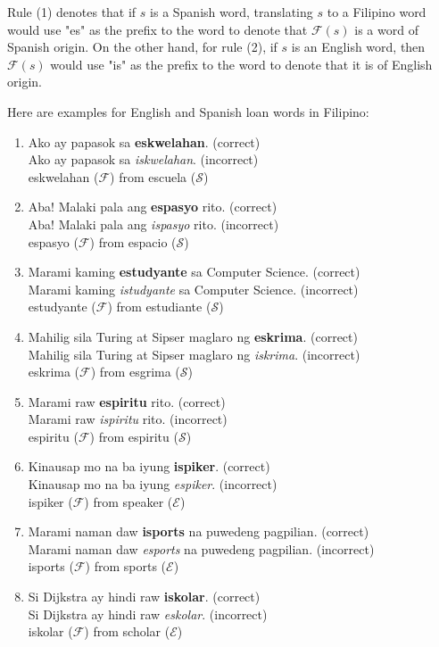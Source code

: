 Rule (1) denotes that if \(s\) is a Spanish word, translating \(s\) to a Filipino
word would use "es" as the prefix to the word to denote that \(\mathcal{F}(s)\)
is a word of Spanish origin. On the other hand, for rule (2), if \(s\) is an
English word, then \(\mathcal{F}(s)\) would use "is" as the prefix to the word
to denote that it is of English origin.

\begin{example}
    Here are examples for English and Spanish loan words in Filipino:
\end{example}
\begin{enumerate}
    \item Ako ay papasok sa \textbf{eskwelahan}. (correct) \\
          Ako ay papasok sa \textit{iskwelahan}. (incorrect) \\
          eskwelahan (\(\mathcal{F}\)) from escuela (\(\mathcal{S}\))
    \item Aba! Malaki pala ang \textbf{espasyo} rito. (correct) \\
          Aba! Malaki pala ang \textit{ispasyo} rito. (incorrect) \\
          espasyo (\(\mathcal{F}\)) from espacio (\(\mathcal{S}\))
    \item Marami kaming \textbf{estudyante} sa Computer Science. (correct) \\
          Marami kaming \textit{istudyante} sa Computer Science. (incorrect)\\
          estudyante (\(\mathcal{F}\)) from estudiante (\(\mathcal{S}\))
    \item Mahilig sila Turing at Sipser maglaro ng \textbf{eskrima}. (correct) \\
          Mahilig sila Turing at Sipser maglaro ng \textit{iskrima}. (incorrect) \\
          eskrima  (\(\mathcal{F}\)) from esgrima (\(\mathcal{S}\))
    \item Marami raw \textbf{espiritu} rito. (correct) \\
          Marami raw \textit{ispiritu} rito. (incorrect) \\
          espiritu (\(\mathcal{F}\)) from espiritu (\(\mathcal{S}\))
    \item Kinausap mo na ba iyung \textbf{ispiker}. (correct) \\
          Kinausap mo na ba iyung \textit{espiker}. (incorrect) \\
          ispiker (\(\mathcal{F}\)) from speaker (\(\mathcal{E}\))
    \item Marami naman daw \textbf{isports} na puwedeng pagpilian. (correct) \\
          Marami naman daw \textit{esports} na puwedeng pagpilian. (incorrect) \\
          isports (\(\mathcal{F}\)) from sports (\(\mathcal{E}\))
    \item Si Dijkstra ay hindi raw \textbf{iskolar}. (correct) \\
          Si Dijkstra ay hindi raw \textit{eskolar}. (incorrect) \\
          iskolar (\(\mathcal{F}\)) from scholar (\(\mathcal{E}\))
\end{enumerate}

